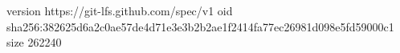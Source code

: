 version https://git-lfs.github.com/spec/v1
oid sha256:382625d6a2c0ae57de4d71e3e3b2b2ae1f2414fa77ec26981d098e5fd59000c1
size 262240
